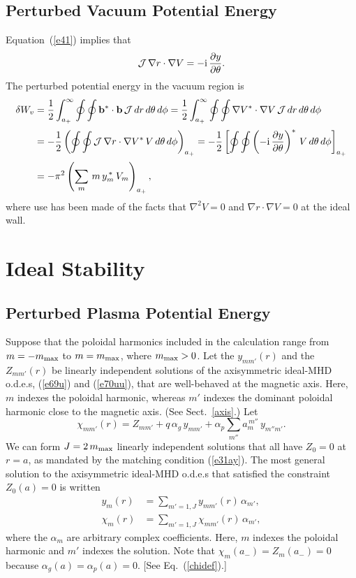 \documentclass[12pt,prb,aps]{revtex4-1}
\begin{document}
\subsection{Perturbed Vacuum Potential Energy}
Equation~(\ref{e41}) implies that 
\begin{equation}
{\cal J} \,\nabla r\cdot\nabla V = - {\rm i}\,\frac{\partial y}{\partial \theta}.
\end{equation}
The perturbed potential energy in the vacuum region is\,\cite{tj1,gs1}
\begin{align}
\delta W_v &= \frac{1}{2}\int_{a_+}^\infty \oint\oint {\bf b}^\ast\cdot{\bf b}\,{\cal J}\,dr\,d\theta\,d\phi
=\frac{1}{2}\int_{a_+}^\infty \oint\oint \nabla V^\ast\cdot\nabla V\,{\cal J}\,dr\,d\theta\,d\phi\nonumber\\[0.5ex]
&= -\frac{1}{2}\left(\oint\oint {\cal J}\,\nabla r\cdot\nabla V^\ast\,V\,d\theta\,d\phi\right)_{a_+}
=-\frac{1}{2}\left[\oint\oint \left(-{\rm i}\,\frac{\partial y}{\partial \theta}\right)^\ast\,V\,d\theta\,d\phi\right]_{a_+}\nonumber\\[0.5ex]
&= - \pi^2\left(\sum_m\,m\,y_m^{\,\ast}\,V_m\right)_{a_+},\label{vac}
\end{align}
where use has been made of the facts that $\nabla^2 V =0$ and $\nabla r\cdot \nabla V=0$ at the ideal wall. 

\section{Ideal Stability}
\subsection{Perturbed Plasma Potential Energy}
Suppose that the poloidal harmonics included in the calculation range from $m=-m_{\rm max}$ to $m=m_{\rm max}$, where $m_{\rm max} >0$. 
Let  the $y_{mm'}(r)$ and the $Z_{mm'}(r)$ be linearly independent solutions of the axisymmetric ideal-MHD o.d.e.s, (\ref{e69u}) and
(\ref{e70uu}), that are well-behaved at the magnetic axis. Here, $m$ indexes the poloidal harmonic, whereas $m'$ indexes the dominant poloidal harmonic close to the magnetic
axis. (See Sect.~\ref{axis}.)
Let 
\begin{equation}
\chi_{mm'}(r)=Z_{mm'} + q\,\alpha_g\,y_{mm'} + \alpha_p\sum_{m''} a_m^{\,m''}\,y_{m''m'}.
\end{equation}
We can form $J=2\,m_{\rm max}$ linearly independent solutions that all have $Z_0=0$ at $r=a$, as mandated by the matching condition (\ref{e31ay}). 
The most general solution to the axisymmetric ideal-MHD o.d.e.s that satisfied the constraint $Z_0(a)=0$ is written
\begin{align}
y_m(r) &= \sum_{m'=1,J} y_{mm'}(r)\,\alpha_{m'},\\[0.5ex]
\chi_m(r)&= \sum_{m'=1,J} \chi_{mm'}(r)\,\alpha_{m'},
\end{align}
where the $\alpha_m$ are arbitrary complex coefficients. Here, $m$ indexes the poloidal harmonic and $m'$ indexes the solution. 
 Note that
$ \chi_m(a_-)=Z_m(a_-)=0$ because $\alpha_g(a)=\alpha_p(a)=0$. [See Eq.~(\ref{chidef}).]
\end{document}
